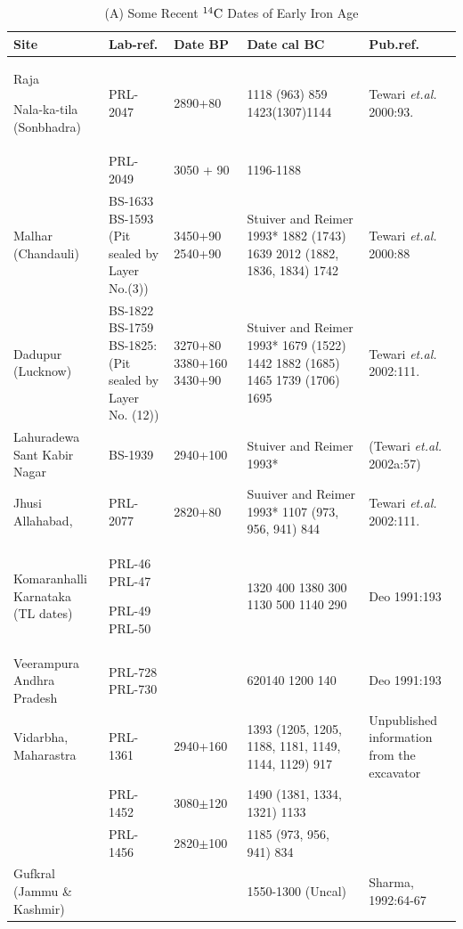 {\setcounter{table}{0}
\renewcommand{\thetable}{III.\arabic{table}}
{\fontsize{7}{8}\selectfont\begin{longtable}{|p{1.3cm}|p{2cm}|p{.9cm}|p{2cm}|p{1.3cm}|}
\caption{{\fontsize{9}{11}\selectfont (A) Some Recent $^{14}{\rm C}$ Dates of Early Iron Age}}\label{table III.1(A)}\\
\hline
\textbf{Site} & \textbf{Lab-ref.} & \textbf{Date BP} & \textbf{Date cal BC} & \textbf{Pub.ref.}\\
\hline
\endfirsthead
\hline
\endhead
\hline 
\endfoot
\hline
\endlastfoot
Raja\par Nala-ka-tila (Sonbhadra)& PRL-2047 &  2890+80 & 1118 (963) 859 1423(1307)1144 & Tewari {\it et.al.} 2000:93.\\
 & PRL-2049 & 3050 + 90& 1196-1188 &   \\
 Malhar \hbox{(Chandauli)} & BS-1633 BS-1593 (Pit sealed by Layer No.(3)) &3450+90 2540+90 & Stuiver and Reimer 1993* 1882 (1743) 1639 2012 (1882, 1836, 1834) 1742 & Tewari {\it et.al.} 2000:88 \\
Dadupur \hbox{(Lucknow)} & BS-1822 BS-1759 BS-1825: (Pit sealed by Layer No. (12)) & 3270+80 3380+160 3430+90 &Stuiver and Reimer 1993* 1679 (1522) 1442 1882 (1685) 1465  1739 (1706) 1695 & Tewari {\it et.al.} 2002:111.\\
Lahuradewa Sant Kabir Nagar & BS-1939 & 2940+100 & Stuiver and Reimer 1993* & (Tewari {\it et.al.} 2002a:57)\\
Jhusi Allahabad, & PRL-2077 &2820+80 &Suuiver and Reimer 1993* 1107 (973, 956, 941) 844 &Tewari {\it et.al.} 2002:111. \\
Komaranhalli Karnataka (TL dates) & PRL-46 PRL-47 \par PRL-49 PRL-50 & &1320 400 1380 300 1130 500 1140 290 & Deo 1991:193\\
Veerampura Andhra Pradesh & PRL-728 PRL-730 & & 620140 1200 140 &Deo 1991:193 \\
Vidarbha, Maharastra & PRL-1361 &2940+160 & 1393 (1205, 1205, 1188, 1181, 1149, 1144, 1129) 917 & Unpublished information from the excavator \\
& PRL-1452& \hbox{3080$\pm$120}& 1490 (1381, 1334, 1321) 1133 & \\
&PRL-1456 & \hbox{2820$\pm$100} & 1185 (973, 956, 941) 834 & \\
Gufkral (Jammu \& Kashmir) & & & 1550-1300 (Uncal)& Sharma, 1992:64-67\\
\end{longtable}}}



